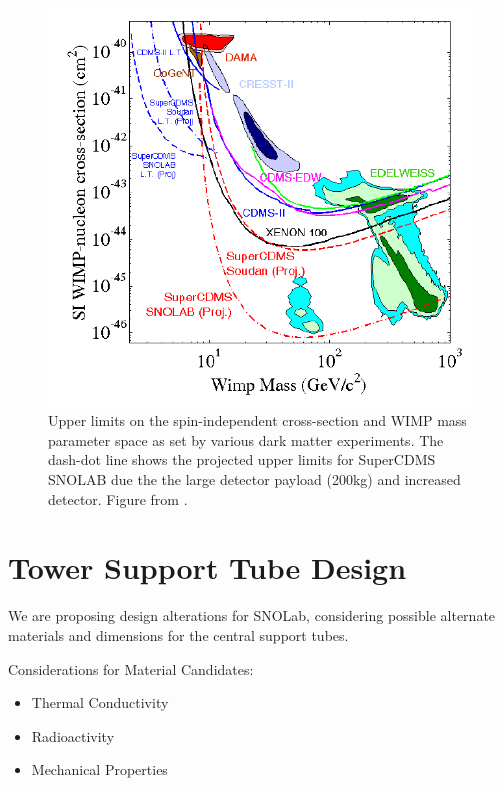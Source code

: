 \documentclass{report}
\begin{document}
\begin{figure}[h]
\centering
\includegraphics[width = .5\textwidth]{crosssection.png}
\caption{Upper limits on the spin-independent cross-section and WIMP mass parameter space as set by various dark matter experiments. The dash-dot line shows the projected upper limits for SuperCDMS SNOLAB due the the large detector payload (200kg) and increased detector. Figure from \cite{DOE}.}
\end{figure}

\chapter{Tower Support Tube Design}

We are proposing design alterations for SNOLab, considering possible alternate materials
and dimensions for the central support tubes.

\bigskip

Considerations for Material Candidates:
\begin{itemize}
\item Thermal Conductivity
\item Radioactivity
\item Mechanical Properties
\end{itemize}
\end{document}
